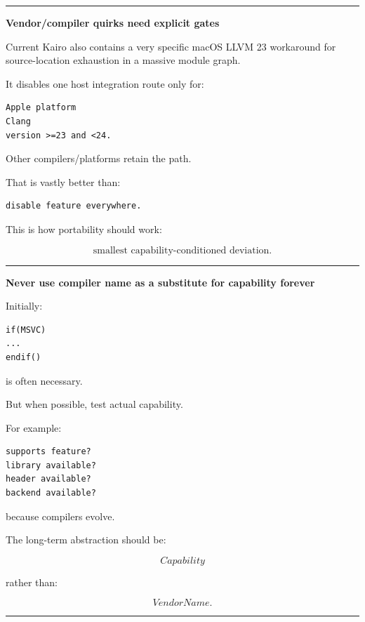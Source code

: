 \begin{center}\rule{0.5\linewidth}{0.5pt}\end{center}

\textbf{Vendor/compiler quirks need explicit gates}

Current Kairo also contains a very specific macOS LLVM 23 workaround for source-location exhaustion in a massive module graph.

It disables one host integration route only for:

\begin{verbatim}
Apple platform
Clang
version >=23 and <24.
\end{verbatim}

Other compilers/platforms retain the path.

That is vastly better than:

\begin{verbatim}
disable feature everywhere.
\end{verbatim}

This is how portability should work:

\[
\text{smallest capability-conditioned deviation}.
\]

\begin{center}\rule{0.5\linewidth}{0.5pt}\end{center}

\textbf{Never use compiler name as a substitute for capability forever}

Initially:

\begin{verbatim}
if(MSVC)
...
endif()
\end{verbatim}

is often necessary.

But when possible, test actual capability.

For example:

\begin{verbatim}
supports feature?
library available?
header available?
backend available?
\end{verbatim}

because compilers evolve.

The long-term abstraction should be:

\[
Capability
\]

rather than:

\[
VendorName.
\]

\begin{center}\rule{0.5\linewidth}{0.5pt}\end{center}

